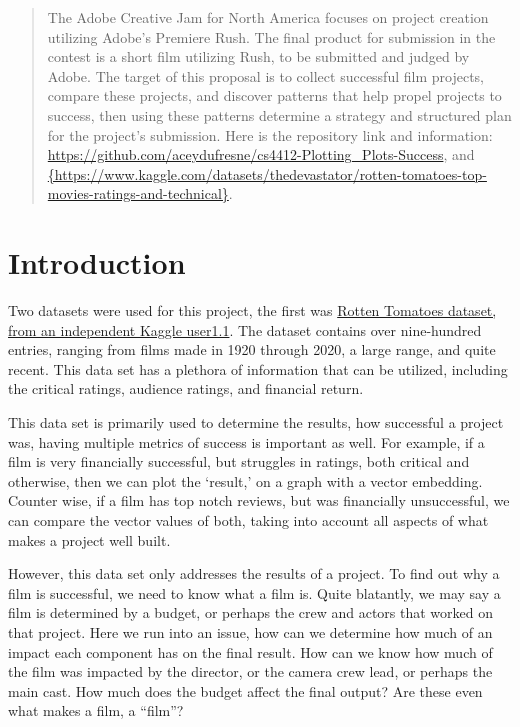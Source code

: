 \documentclass[conference]{IEEEtran}
\author{
\IEEEauthorblockN{Acey Dufresne}
\IEEEauthorblockA{
Student ID: 000960649\\
Kennesaw State University\\
cdufres1@students.kennesaw.edu
}
}
\begin{document}
\maketitle

\begin{abstract}
The Adobe Creative Jam for North America focuses on project creation utilizing Adobe’s Premiere Rush. The final product for submission in the contest is a short film utilizing Rush, to be submitted and judged by Adobe. The target of this proposal is to collect successful film projects, compare these projects, and discover patterns that help propel projects to success, then using these patterns determine a strategy and structured plan for the project’s submission. Here is the repository link and information: \url{https://github.com/aceydufresne/cs4412-Plotting_Plots-Success}, and \url{{https://www.kaggle.com/datasets/thedevastator/rotten-tomatoes-top-movies-ratings-and-technical}}.
\vspace{30 pt}

\end{abstract}

\section{Introduction}

Two datasets were used for this project, the first was \href{https://www.kaggle.com/datasets/thedevastator/rotten-tomatoes-top-movies-ratings-and-technical}{ Rotten Tomatoes dataset, from an independent Kaggle user1.1}. The dataset contains over nine-hundred entries, ranging from films made in 1920 through 2020, a large range, and quite recent. This data set has a plethora of information that can be utilized, including the critical ratings, audience ratings, and financial return.

This data set is primarily used to determine the results, how successful a project was, having multiple metrics of success is important as well. For example, if a film is very financially successful, but struggles in ratings, both critical and otherwise, then we can plot the ‘result,’ on a graph with a vector embedding. Counter wise, if a film has top notch reviews, but was financially unsuccessful, we can compare the vector values of both, taking into account all aspects of what makes a project well built.

However, this data set only addresses the results of a project. To find out why a film is successful, we need to know what a film is. Quite blatantly, we may say a film is determined by a budget, or perhaps the crew and actors that worked on that project. Here we run into an issue, how can we determine how much of an impact each component has on the final result. How can we know how much of the film was impacted by the director, or the camera crew lead, or perhaps the main cast. How much does the budget affect the final output? Are these even what makes a film, a “film”?
\end{document}
